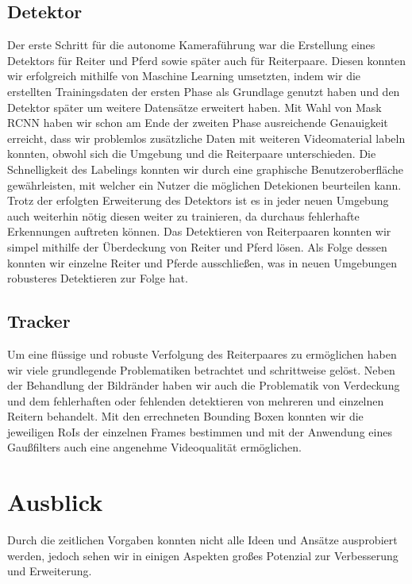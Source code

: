 \subsection*{ Detektor}
Der erste Schritt für die autonome Kameraführung war die Erstellung eines Detektors für Reiter und Pferd sowie später auch für Reiterpaare. Diesen konnten wir erfolgreich mithilfe von Maschine Learning umsetzten, indem wir die erstellten Trainingsdaten der ersten Phase als Grundlage genutzt haben und den Detektor später um weitere Datensätze erweitert haben. Mit Wahl von Mask RCNN haben wir schon am Ende der zweiten Phase ausreichende Genauigkeit erreicht, dass wir problemlos zusätzliche Daten mit weiteren Videomaterial labeln konnten, obwohl sich die Umgebung und die Reiterpaare unterschieden. Die Schnelligkeit des Labelings konnten wir durch eine graphische Benutzeroberfläche gewährleisten, mit welcher ein Nutzer die möglichen Detekionen beurteilen kann. Trotz der erfolgten Erweiterung des Detektors ist es in jeder neuen Umgebung auch weiterhin nötig diesen weiter zu trainieren, da durchaus fehlerhafte Erkennungen auftreten können.
Das Detektieren von Reiterpaaren konnten wir simpel mithilfe der Überdeckung von Reiter und Pferd lösen. Als Folge dessen konnten wir einzelne Reiter und Pferde ausschließen, was in neuen Umgebungen robusteres Detektieren zur Folge hat.



\subsection*{ Tracker}
Um eine flüssige und robuste Verfolgung des Reiterpaares zu ermöglichen haben wir viele grundlegende Problematiken betrachtet und schrittweise gelöst. Neben der Behandlung der Bildränder haben wir auch die Problematik von Verdeckung und dem fehlerhaften oder fehlenden detektieren von mehreren und einzelnen Reitern behandelt. Mit den errechneten Bounding Boxen konnten wir die jeweiligen RoIs der einzelnen Frames bestimmen und mit der Anwendung eines Gaußfilters auch eine angenehme Videoqualität ermöglichen.

\section{Ausblick}
Durch die zeitlichen Vorgaben konnten nicht alle Ideen und Ansätze ausprobiert werden, jedoch sehen wir in einigen Aspekten großes Potenzial zur Verbesserung und Erweiterung.

